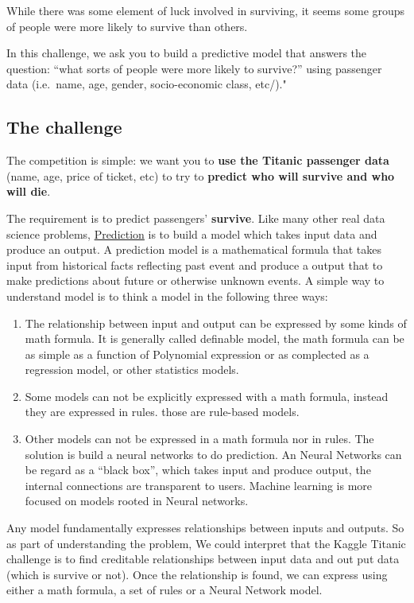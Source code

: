 \documentclass[
]{book}
\providecommand{\tightlist}{%
  \setlength{\itemsep}{0pt}\setlength{\parskip}{0pt}}
\begin{document}
While there was some element of luck involved in surviving, it seems some groups of people were more likely to survive than others.

In this challenge, we ask you to build a predictive model that answers the question: ``what sorts of people were more likely to survive?'' using passenger data (i.e.~name, age, gender, socio-economic class, etc/)."

\hypertarget{the-challenge}{%
\subsection*{The challenge}\label{the-challenge}}


The competition is simple: we want you to \textbf{use the Titanic passenger data} (name, age, price of ticket, etc) to try to \textbf{predict who will survive and who will die}.

The requirement is to predict passengers' \textbf{survive}. Like many other real data science problems, \protect\hyperlink{predictive}{Prediction} is to build a model which takes input data and produce an output. A prediction model is a mathematical formula that takes input from historical facts reflecting past event and produce a output that to make predictions about future or otherwise unknown events. A simple way to understand model is to think a model in the following three ways:

\begin{enumerate}
\def\labelenumi{\arabic{enumi}.}
\tightlist
\item
  The relationship between input and output can be expressed by some kinds of math formula. It is generally called definable model, the math formula can be as simple as a function of Polynomial expression or as complected as a regression model, or other statistics models.
\item
  Some models can not be explicitly expressed with a math formula, instead they are expressed in rules. those are rule-based models.
\item
  Other models can not be expressed in a math formula nor in rules. The solution is build a neural networks to do prediction. An Neural Networks can be regard as a ``black box'', which takes input and produce output, the internal connections are transparent to users. Machine learning is more focused on models rooted in Neural networks.
\end{enumerate}

Any model fundamentally expresses relationships between inputs and outputs. So as part of understanding the problem, We could interpret that the Kaggle Titanic challenge is to find creditable relationships between input data and out put data (which is survive or not). Once the relationship is found, we can express using either a math formula, a set of rules or a Neural Network model.
\end{document}
